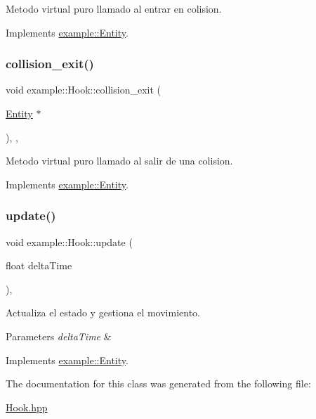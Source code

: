 Metodo virtual puro llamado al entrar en colision. 



Implements \mbox{\hyperlink{classexample_1_1_entity_a09f6836192c2f8bce91a7b4f6934b94e}{example\+::\+Entity}}.

\mbox{\label{classexample_1_1_hook_a329b5437b6a05c621b8d0be35e326bb5}} 
\subsubsection{\texorpdfstring{collision\_exit()}{collision\_exit()}}
{\footnotesize\ttfamily void example\+::\+Hook\+::collision\+\_\+exit (\begin{DoxyParamCaption}\item[{\mbox{\hyperlink{classexample_1_1_entity}{Entity}} $\ast$}]{ }\end{DoxyParamCaption})\hspace{0.3cm}{\ttfamily [inline]}, {\ttfamily [override]}, {\ttfamily [virtual]}}



Metodo virtual puro llamado al salir de una colision. 



Implements \mbox{\hyperlink{classexample_1_1_entity_ae5d520b5f0dda6bb56a6c74eaf1c850c}{example\+::\+Entity}}.

\mbox{\label{classexample_1_1_hook_a23c335b2ccc707a1444109a849d8020e}} 
\subsubsection{\texorpdfstring{update()}{update()}}
{\footnotesize\ttfamily void example\+::\+Hook\+::update (\begin{DoxyParamCaption}\item[{float}]{delta\+Time }\end{DoxyParamCaption})\hspace{0.3cm}{\ttfamily [override]}, {\ttfamily [virtual]}}



Actualiza el estado y gestiona el movimiento. 


\begin{DoxyParams}{Parameters}
{\em delta\+Time} & \\
\hline
\end{DoxyParams}


Implements \mbox{\hyperlink{classexample_1_1_entity_a5dded5c361451f2cfdf7ed3c7de1194f}{example\+::\+Entity}}.



The documentation for this class was generated from the following file\+:\begin{DoxyCompactItemize}
\item 
\mbox{\hyperlink{_hook_8hpp}{Hook.\+hpp}}\end{DoxyCompactItemize}
